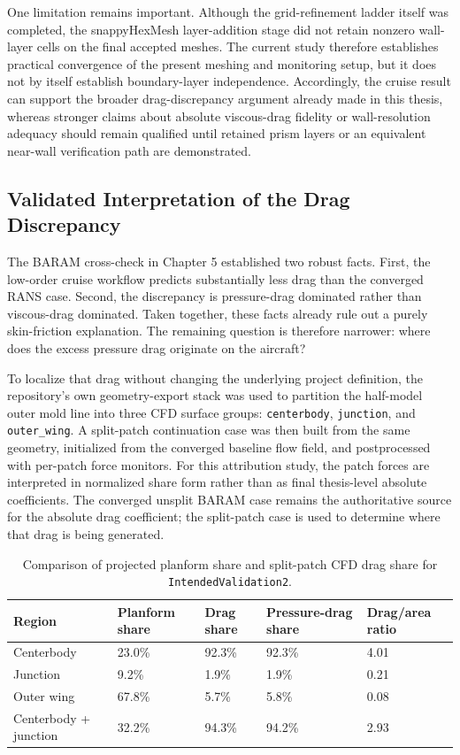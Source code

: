 \documentclass[12pt]{report}
\begin{document}
One limitation remains important. Although the grid-refinement ladder itself was completed, the snappyHexMesh layer-addition stage did not retain nonzero wall-layer cells on the final accepted meshes. The current study therefore establishes practical convergence of the present meshing and monitoring setup, but it does not by itself establish boundary-layer independence. Accordingly, the cruise result can support the broader drag-discrepancy argument already made in this thesis, whereas stronger claims about absolute viscous-drag fidelity or wall-resolution adequacy should remain qualified until retained prism layers or an equivalent near-wall verification path are demonstrated.

\subsection{Validated Interpretation of the Drag Discrepancy}
The BARAM cross-check in Chapter 5 established two robust facts. First, the low-order cruise workflow predicts substantially less drag than the converged RANS case. Second, the discrepancy is pressure-drag dominated rather than viscous-drag dominated. Taken together, these facts already rule out a purely skin-friction explanation. The remaining question is therefore narrower: where does the excess pressure drag originate on the aircraft?

To localize that drag without changing the underlying project definition, the repository's own geometry-export stack was used to partition the half-model outer mold line into three CFD surface groups: \texttt{centerbody}, \texttt{junction}, and \texttt{outer\_wing}. A split-patch continuation case was then built from the same geometry, initialized from the converged baseline flow field, and postprocessed with per-patch force monitors. For this attribution study, the patch forces are interpreted in normalized share form rather than as final thesis-level absolute coefficients. The converged unsplit BARAM case remains the authoritative source for the absolute drag coefficient; the split-patch case is used to determine where that drag is being generated.

\begin{table}[htbp]
\centering
\caption{Comparison of projected planform share and split-patch CFD drag share for \texttt{IntendedValidation2}.}
\label{tab:intendedvalidation2-drag-attribution}
\begin{tabular}{lllll}
\toprule
\textbf{Region} & \textbf{Planform share} & \textbf{Drag share} & \textbf{Pressure-drag share} & \textbf{Drag/area ratio} \\
\midrule
Centerbody & 23.0\% & 92.3\% & 92.3\% & 4.01 \\
Junction & 9.2\% & 1.9\% & 1.9\% & 0.21 \\
Outer wing & 67.8\% & 5.7\% & 5.8\% & 0.08 \\
\midrule
Centerbody + junction & 32.2\% & 94.3\% & 94.2\% & 2.93 \\
\bottomrule
\end{tabular}
\end{table}
\end{document}
